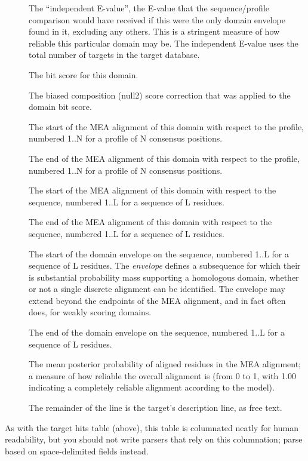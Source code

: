 \begin{description}
\item[] The ``independent E-value'', the
  E-value that the sequence/profile comparison would have received if
  this were the only domain envelope found in it, excluding any
  others. This is a stringent measure of how reliable this particular
  domain may be. The independent E-value uses the total number of
  targets in the target database.

\item[] The bit score for this domain.

\item[] The biased composition (null2) score
  correction that was applied to the domain bit score.

\item[]
  The start of the MEA alignment of this domain with respect to the
  profile, numbered 1..N for a profile of N consensus positions.

\item[]
  The end of the MEA alignment of this domain with respect to the
  profile, numbered 1..N for a profile of N consensus positions.

\item[]
  The start of the MEA alignment of this domain with respect to the
  sequence, numbered 1..L for a sequence of L residues.
 
\item[]
  The end of the MEA alignment of this domain with respect to the
  sequence, numbered 1..L for a sequence of L residues.

\item[] The start of the domain
  envelope on the sequence, numbered 1..L for a sequence of L
  residues. The \emph{envelope} defines a subsequence for which their
  is substantial probability mass supporting a homologous domain, 
  whether or not a single discrete alignment can be identified. 
  The envelope may extend beyond the endpoints of the MEA alignment,
  and in fact often does, for weakly scoring domains.

\item[] The end of the domain
  envelope on the sequence, numbered 1..L for a sequence of L
  residues. 

\item[] The mean posterior probability of aligned
  residues in the MEA alignment; a measure of how reliable the overall
  alignment is (from 0 to 1, with 1.00 indicating a completely
  reliable alignment according to the model).

\item[] The remainder of the line
  is the target's description line, as free text.
\end{description}

As with the target hits table (above), this table is columnated neatly
for human readability, but you should not write parsers that rely on
this columnation; parse based on space-delimited fields instead.
